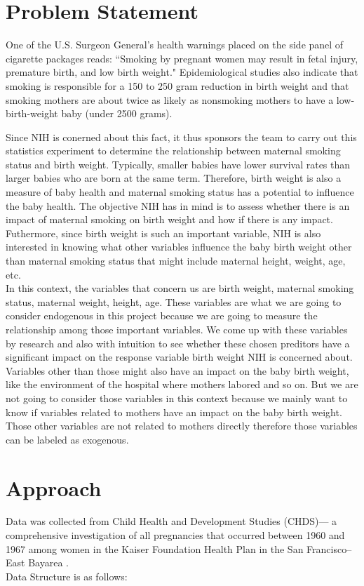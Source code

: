\documentclass[12pt,letterpaper]{article}
\theoremstyle{definition}
\begin{document}
\section{Problem Statement}
One of the U.S. Surgeon General’s health warnings placed on the side panel of cigarette packages reads: ``Smoking by pregnant women may result in fetal injury, premature birth, and low birth weight." Epidemiological studies \cite{MT90} also indicate that smoking is responsible for a 150 to 250 gram reduction in birth weight and that smoking mothers are about twice as likely as nonsmoking mothers to have a low-birth-weight baby (under 2500 grams). 

\indent Since NIH is conerned about this fact, it thus sponsors the team to carry out this statistics experiment to determine the relationship between maternal smoking status and birth weight. Typically, smaller babies have lower survival rates than larger babies who are born at the same term. Therefore, birth weight is also a measure of baby health and maternal smoking status has a potential to influence the baby health. The objective NIH has in mind is to assess whether there is an impact of maternal smoking on birth weight and how if there is any impact. Futhermore, since birth weight is such an important variable, NIH is also interested in knowing what other variables influence the baby birth weight other than maternal smoking status that might include maternal height, weight, age, etc.\\
\indent In this context, the variables that concern us are birth weight, maternal smoking status, maternal weight, height, age. These variables are what we are going to consider endogenous in this project because we are going to measure the relationship among those important variables. We come up with these variables by research and also with intuition to see whether these chosen preditors have a significant impact on the response variable birth weight NIH is concerned about. Variables other than those might also have an impact on the baby birth weight, like the environment of the hospital where mothers labored and so on. But we are not going to consider those variables in this context because we mainly want to know if variables related to mothers have an impact on the baby birth weight. Those other variables are not related to mothers directly therefore those variables can be labeled as exogenous. 





\section{Approach}
Data was collected from Child Health and Development Studies (CHDS)--- a comprehensive investigation of all pregnancies that occurred between 1960 and 1967 among women in the Kaiser Foundation Health Plan in the San Francisco–East Bayarea \cite{Yer71}. \\
Data Structure is as follows:
\end{document}
